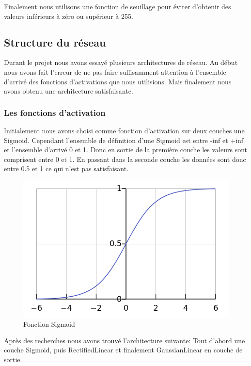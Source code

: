\documentclass[12pt, a4paper]{article}
\begin{document}
Finalement nous utilisons une fonction de seuillage pour éviter d'obtenir des valeurs inférieurs à zéro ou supérieur à 255.

	\subsection{Structure du réseau}
Durant le projet nous avons essayé plusieurs architectures de réseau. Au début nous avons fait l'erreur de ne pas faire suffisamment attention à l'ensemble d'arrivé des fonctions d'activations que nous utilisions. Mais finalement nous avons obtenu une architecture satisfaisante.

	\subsubsection{Les fonctions d'activation}
Initialement nous avons choisi comme fonction d'activation sur deux couches une Sigmoid. Cependant l'ensemble de définition d'une Sigmoid est entre -inf et +inf et l'ensemble d'arrivé 0 et 1. Donc en sortie de la première couche les valeurs sont comprisent entre 0 et 1. En passant dans la seconde couche les données sont donc entre 0.5 et 1 ce qui n'est pas satisfaisant. 

\begin{figure}[h!]
  \centering
  \includegraphics[scale=0.4]{Images/sigmoid.png}
  \caption{Fonction Sigmoid}
\end{figure}

Après des recherches nous avons trouvé l'architecture suivante:
Tout d'abord une couche Sigmoid, puis RectifiedLinear et finalement GaussianLinear en couche de sortie.
\end{document}
